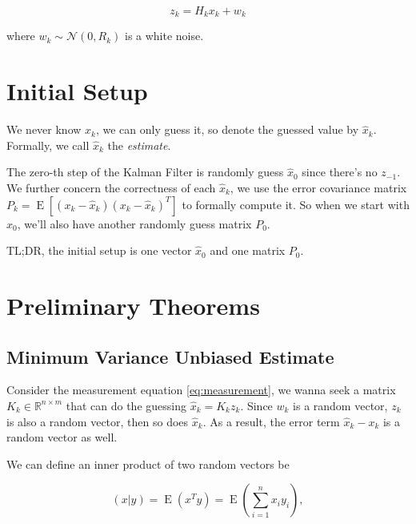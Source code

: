 \documentclass{article}
\begin{document}
            \begin{equation}\label{eq:measurement}
                 z_{k} = H_{k} x_{k} + w_{k}
            \end{equation}

            where $ w_{k} \sim \mathcal{N}(0, R_{k}) $  is a white noise.

    \section{Initial Setup}

        We never know $ x_{k} $, we can only guess it, so denote the guessed value
        by $ \hat{x}_{k} $. Formally, we call $ \hat{x}_{k} $ the \textit{estimate}.

        The zero-th step of the Kalman Filter is randomly guess $ \hat{x}_{0} $
        since there's no $ z_{-1} $. We further concern the correctness of each
        $ \hat{x}_{k} $, we use the error covariance matrix $ P_{k} =
        \operatorname{E}[(x_{k} - \hat{x}_{k})(x_{k} - \hat{x}_{k})^{T}] $ to
        formally compute it. So when we start with $ x_{0} $, we'll also have
        another randomly guess matrix $ P_{0} $.

        TL;DR, the initial setup is one
        vector $ \hat{x}_{0} $ and one matrix $ P_{0} $.

    \section{Preliminary Theorems}

        \subsection{Minimum Variance Unbiased Estimate}

            Consider the measurement equation \eqref{eq:measurement}, we wanna
            seek a matrix $ K_{k} \in \mathbb{R}^{n \times m} $ that can do the guessing $ \hat{x}_{k} =
            K_{k}z_{k} $. Since $ w_{k} $ is a random vector, $ z_{k} $ is also
            a random vector, then so does $ \hat{x}_{k} $. As a result, the error
            term $ \hat{x}_{k} - x_{k} $ is a random vector as well.

            We can define an inner product of two random vectors be

            \begin{equation*}
                (x|y) = \operatorname{E}(x^{T} y) = \operatorname{E}\left(
                \sum_{i=1}^{n} x_{i} y_{i} \right),
            \end{equation*}
\end{document}
